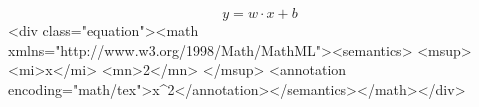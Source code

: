 $$
y = w \cdot x + b
$$<div class="equation"><math xmlns="http://www.w3.org/1998/Math/MathML"><semantics>
<msup>
  <mi>x</mi>
  <mn>2</mn>
</msup>
<annotation encoding="math/tex">x^2</annotation></semantics></math></div>